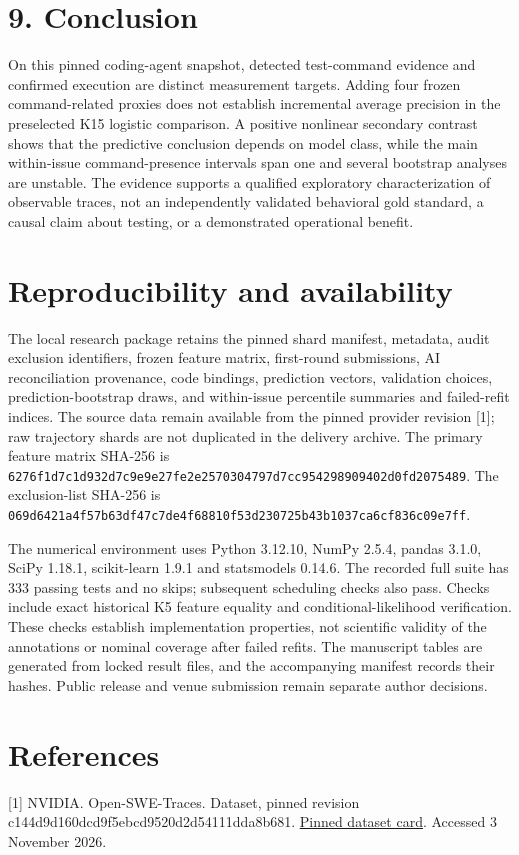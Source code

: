 \documentclass[10pt,a4paper]{article}
\begin{document}
\section{9. Conclusion}
On this pinned coding-agent snapshot, detected test-command evidence and confirmed execution are distinct measurement targets. Adding four frozen command-related proxies does not establish incremental average precision in the preselected K15 logistic comparison. A positive nonlinear secondary contrast shows that the predictive conclusion depends on model class, while the main within-issue command-presence intervals span one and several bootstrap analyses are unstable. The evidence supports a qualified exploratory characterization of observable traces, not an independently validated behavioral gold standard, a causal claim about testing, or a demonstrated operational benefit.

\section{Reproducibility and availability}
The local research package retains the pinned shard manifest, metadata, audit exclusion identifiers, frozen feature matrix, first-round submissions, AI reconciliation provenance, code bindings, prediction vectors, validation choices, prediction-bootstrap draws, and within-issue percentile summaries and failed-refit indices. The source data remain available from the pinned provider revision [1]; raw trajectory shards are not duplicated in the delivery archive. The primary feature matrix SHA-256 is \nolinkurl{6276f1d7c1d932d7c9e9e27fe2e2570304797d7cc954298909402d0fd2075489}. The exclusion-list SHA-256 is \nolinkurl{069d6421a4f57b63df47c7de4f68810f53d230725b43b1037ca6cf836c09e7ff}.

The numerical environment uses Python 3.12.10, NumPy 2.5.4, pandas 3.1.0, SciPy 1.18.1, scikit-learn 1.9.1 and statsmodels 0.14.6. The recorded full suite has 333 passing tests and no skips; subsequent scheduling checks also pass. Checks include exact historical K5 feature equality and conditional-likelihood verification. These checks establish implementation properties, not scientific validity of the annotations or nominal coverage after failed refits. The manuscript tables are generated from locked result files, and the accompanying manifest records their hashes. Public release and venue submission remain separate author decisions.

\section{References}
[1] NVIDIA. Open-SWE-Traces. Dataset, pinned revision c144d9d160dcd9f5ebcd9520d2d54111dda8b681. \href{https://huggingface.co/datasets/nvidia/Open-SWE-Traces/blob/c144d9d160dcd9f5ebcd9520d2d54111dda8b681/README.md}{Pinned dataset card}. Accessed 3 November 2026.
\end{document}
